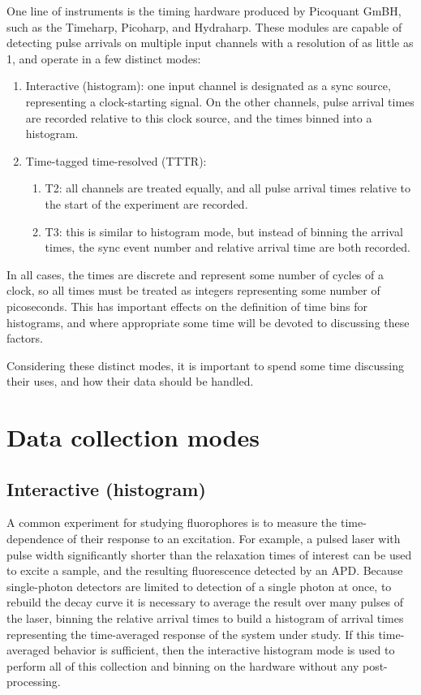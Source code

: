 \documentclass{book}
\begin{document}
One line of instruments is the timing hardware produced by Picoquant GmBH, such as the Timeharp, Picoharp, and Hydraharp. These modules are capable of detecting pulse arrivals on multiple input channels with a resolution of as little as 1\pico\second, and operate in a few distinct modes:
\begin{enumerate}
\item Interactive (histogram): one input channel is designated as a sync source, representing a clock-starting signal. On the other channels, pulse arrival times are recorded relative to this clock source, and the times binned into a histogram. 
\item Time-tagged time-resolved (TTTR): 
	\begin{enumerate}
	\item T2: all channels are treated equally, and all pulse arrival times relative to the start of the experiment are recorded. 
	\item T3: this is similar to histogram mode, but instead of binning the arrival times, the sync event number and relative arrival time are both recorded.
	\end{enumerate}
\end{enumerate}

In all cases, the times are discrete and represent some number of cycles of a clock, so all times must be treated as integers representing some number of picoseconds. This has important effects on the definition of time bins for histograms, and where appropriate some time will be devoted to discussing these factors. 

Considering these distinct modes, it is important to spend some time discussing their uses, and how their data should be handled.

\section{Data collection modes}
\subsection{Interactive (histogram)}
A common experiment for studying fluorophores is to measure the time-dependence of their response to an excitation. For example, a pulsed laser with pulse width significantly shorter than the relaxation times of interest can be used to excite a sample, and the resulting fluorescence detected by an APD. Because single-photon detectors are limited to detection of a single photon at once, to rebuild the decay curve it is necessary to average the result over many pulses of the laser, binning the relative arrival times to build a histogram of arrival times representing the time-averaged response of the system under study. If this time-averaged behavior is sufficient, then the interactive histogram mode is used to perform all of this collection and binning on the hardware without any post-processing. 
\end{document}
